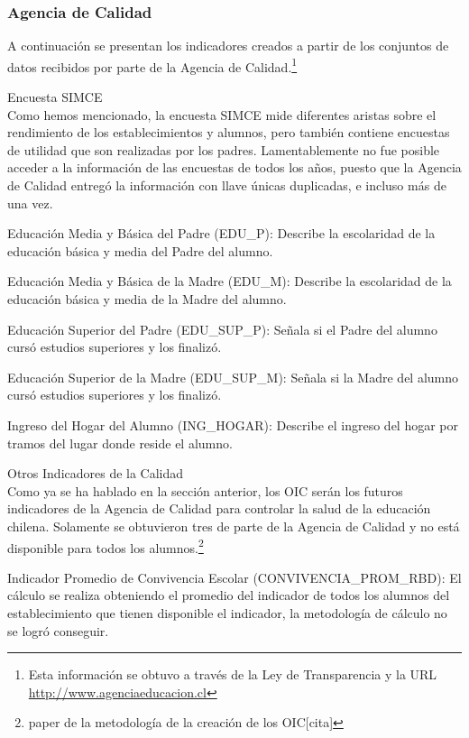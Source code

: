 \subsubsection{Agencia de Calidad}
A continuación se presentan los indicadores creados a partir de los conjuntos de datos recibidos por parte de la Agencia de Calidad.\footnote{Esta información se obtuvo a través de la Ley de Transparencia y la URL \url{http://www.agenciaeducacion.cl}}
\begin{longdescription}
  \item[Encuesta SIMCE] \hfill \\
    Como hemos mencionado, la encuesta SIMCE mide diferentes aristas sobre el rendimiento de los establecimientos y alumnos, pero también contiene encuestas de utilidad que son realizadas por los padres. Lamentablemente no fue posible acceder a la información de las encuestas de todos los años, puesto que la Agencia de Calidad entregó la información con llave únicas duplicadas, e incluso más de una vez.
     \begin{longdescription}
        \item[Educación Media y Básica del Padre](EDU\_P): Describe la escolaridad de la educación básica y media del Padre del alumno.
        \item[Educación Media y Básica de la Madre](EDU\_M): Describe la escolaridad de la educación básica y media de la Madre del alumno.
        \item[Educación Superior del Padre](EDU\_SUP\_P): Señala si el Padre del alumno cursó estudios superiores y los finalizó.
        \item[Educación Superior de la Madre](EDU\_SUP\_M): Señala si la Madre del alumno cursó estudios superiores y los finalizó.
        \item[Ingreso del Hogar del Alumno](ING\_HOGAR): Describe el ingreso del hogar por tramos del lugar donde reside el alumno.
     \end{longdescription}
  \item[Otros Indicadores de la Calidad] \hfill \\
    Como ya se ha hablado en la sección anterior, los OIC serán los futuros indicadores de la Agencia de Calidad para controlar la salud de la educación chilena. Solamente se obtuvieron tres de parte de la Agencia de Calidad y no está disponible para todos los alumnos.\footnote{paper de la metodología de la creación de los OIC[cita]}
       \begin{longdescription}
        \item[Indicador Promedio de Convivencia Escolar](CONVIVENCIA\_PROM\_RBD): El cálculo se realiza obteniendo el promedio del indicador de todos los alumnos del establecimiento que tienen disponible el indicador, la metodología de cálculo no se logró conseguir.

\end{longdescription}
\end{longdescription}
